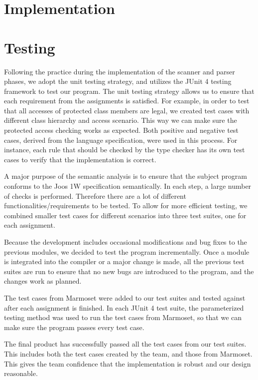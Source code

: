 \documentclass[a4paper, notitlepage]{report}
\begin{document}
\clearpage
\chapter{Implementation}
\label{implementation}





\chapter{Testing}
\label{testing}
Following the practice during the implementation of the scanner and parser phases, we adopt the unit testing strategy, and utilizes the JUnit 4 testing framework to test our program. The unit testing strategy allows us to ensure that each requirement from the assignments is satisfied. For example, in order to test that all accesses of protected class members are legal, we created test cases with different class hierarchy and access scenario. This way we can make sure the protected access checking works as expected. Both positive and negative test cases, derived from the language specification, were used in this process. For instance, each rule that should be checked by the type checker has its own test cases to verify that the implementation is correct.

A major purpose of the semantic analysis is to ensure that the subject program conforms to the Joos 1W specification semantically. In each step, a large number of checks is performed. Therefore there are a lot of different functionalities/requirements to be tested. To allow for more efficient testing, we combined smaller test cases for different scenarios into three test suites, one for each assignment.

Because the development includes occasional modifications and bug fixes to the previous modules, we decided to test the program incrementally. Once a module is integrated into the compiler or a major change is made, all the previous test suites are run to ensure that no new bugs are introduced to the program, and the changes work as planned.

The test cases from Marmoset were added to our test suites and tested against after each assignment is finished. In each JUnit 4 test suite, the parameterized testing method was used to run the test cases from Marmoset, so that we can make sure the program passes every test case. 

The final product has successfully passed all the test cases from our test suites. This includes both the test cases created by the team, and those from Marmoset. This gives the team confidence that the implementation is robust and our design reasonable.
\end{document}
